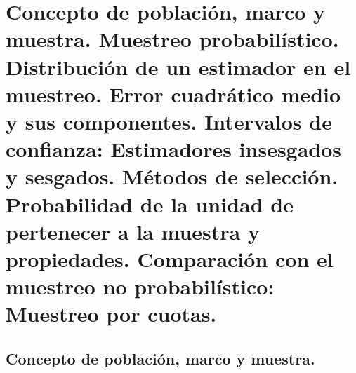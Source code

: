 %

\chapter{Concepto de poblaci\'on, marco y muestra. Muestreo probabil\'istico.
Distribuci\'on de un estimador en el muestreo. Error cuadr\'atico medio
y sus componentes. Intervalos de confianza: Estimadores insesgados
y sesgados. M\'etodos de selecci\'on. Probabilidad de la unidad de pertenecer
a la muestra y propiedades. Comparaci\'on con el muestreo no probabil\'istico:
Muestreo por cuotas.}


\section{Concepto de poblaci\'on, marco y muestra.}

